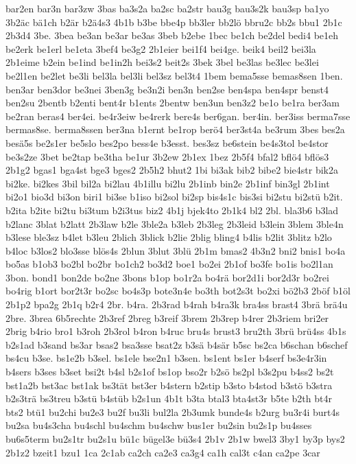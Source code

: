 {bar2en
bar3n
bar3zw
3bas
ba3s2a
ba2sc
ba2str
bau3g
bau3s2k
bau3sp
ba1yo
3b2äc
bä1ch
b2är
b2ä4s3
4b1b
b3be
bbe4p
bb3ler
bb2lö
bbru2c
bb2s
bbu1
2b1c
2b3d4
3be.
3bea
be3an
be3ar
be3as
3beb
b2ebe
1bec
be1ch
be2del
bedi4
be1eh
be2erk
be1erl
be1eta
3bef4
be3g2
2b1eier
bei1f4
bei4ge.
beik4
beil2
bei3la
2b1eime
b2ein
be1ind
be1in2h
bei3s2
beit2s
3bek
3bel
be3las
be3lec
be3lei
be2l1en
be2let
be3li
bel3la
bel3li
bel3sz
bel3t4
1bem
bema5sse
bemas8sen
1ben.
ben3ar
ben3dor
be3nei
3ben3g
be3n2i
ben3n
ben2se
ben4spa
ben4spr
benst4
ben2su
2bentb
b2enti
bent4r
b1ents
2bentw
ben3un
ben3z2
be1o
be1ra
ber3am
be2ran
beras4
ber4ei.
be4r3eiw
be4rerk
bere4s
ber6gan.
ber4in.
ber3iss
berma7sse
bermas8se.
berma8ssen
ber3na
b1ernt
be1rop
berö4
ber3st4a
be3rum
3bes
bes2a
besä5s
be2s1er
be5slo
bes2po
bess4e
b3esst.
bes3sz
be6stein
be4s3tol
be4stor
be3s2ze
3bet
be2tap
be3tha
be1ur
3b2ew
2b1ex
1bez
2b5f4
bfal2
bflö4
bflös3
2b1g2
bgas1
bga4st
bge3
bges2
2b5h2
bhut2
1bi
bi3ak
bib2
bibe2
bie4str
bik2a
bi2ke.
bi2kes
3bil
bil2a
bi2lau
4b1illu
bi2lu
2b1inb
bin2e
2b1inf
bin3gl
2b1int
bi2o1
bio3d
bi3on
biri1
bi3se
b1iso
bi2sol
bi2sp
bis4s1c
bis3si
bi2stu
bi2stü
b2it.
b2ita
b2ite
bi2tu
bi3tum
b2i3tus
biz2
4b1j
bjek4to
2b1k4
bl2
2bl.
bla3b6
b3lad
b2lanc
3blat
b2latt
2b3law
b2le
3ble2a
b3leb
2b3leg
2b3leid
b3lein
3blem
3ble4n
b3lese
ble3sz
b4let
b3leu
2blich
3blick
b2lie
2blig
bling4
b4lis
b2lit
3blitz
b2lo
b4loc
b3los2
blo3sse
blös4s
2blun
3blut
3blü
2b1m
bmas2
4b3n2
bni2
bnis1
bo4a
bo5as
b1ob3
bo2bl
bo2br
bo1ch2
bo3d2
boe1
bo2ei
2b1of
bo3fe
bo1is
bo2l1an
3bon.
bond1
bon2de
bo2ne
3bons
b1op
bo1r2a
bo4rä
bor2d1i
bor2d3r
bo2rei
bo4rig
b1ort
bor2t3r
bo2sc
bo4s3p
bote3n4e
bo3th
bot2s3t
bo2xi
bö2b3
2böf
b1öl
2b1p2
bpa2g
2b1q
b2r4
2br.
b4ra.
2b3rad
b4rah
b4ra3k
bra4ss
brast4
3brä
brä4u
2bre.
3brea
6b5rechte
2b3ref
2breg
b3reif
3brem
2b3rep
b4rer
2b3riem
bri2er
2brig
b4rio
bro1
b3roh
2b3rol
b4ron
b4ruc
bru4s
brust3
bru2th
3brü
brü4ss
4b1s
b2s1ad
b3sand
bs3ar
bsas2
bsa3sse
bsat2z
b3sä
b4sär
b5sc
bs2ca
b6schan
b6schef
bs4cu
b3se.
bs1e2b
b3sel.
bs1ele
bse2n1
b3sen.
bs1ent
bs1er
b4serf
bs3e4r3in
b4sers
b3ses
b3set
bsi2t
b4sl
b2s1of
bs1op
bso2r
b2sö
bs2pl
b3s2pu
b4ss2
bs2t
bst1a2b
bst3ac
bst1ak
bs3tät
bst3er
b4stern
b2stip
b3sto
b4stod
b3stö
b3stra
b2s3trä
bs3treu
b3stü
b4stüb
b2s1un
4b1t
b3ta
btal3
bta4st3r
b5te
b2th
bt4r
bts2
btü1
bu2chi
bu2e3
bu2f
bu3li
bul2la
2b3umk
bunde4s
b2urg
bu3r4i
burt4s
bu2sa
bu4s3cha
bu4schl
bu4schm
bu4schw
bus1er
bu2sin
bu2s1p
bu4sses
bu6s5term
bu2s1tr
bu2s1u
bü1c
bügel3e
bü3s4
2b1v
2b1w
bwel3
3by1
by3p
bys2
2b1z2
bzeit1
bzu1
1ca
2c1ab
ca2ch
ca2e3
ca3g4
ca1h
cal3t
c4an
ca2pe
3car
}
